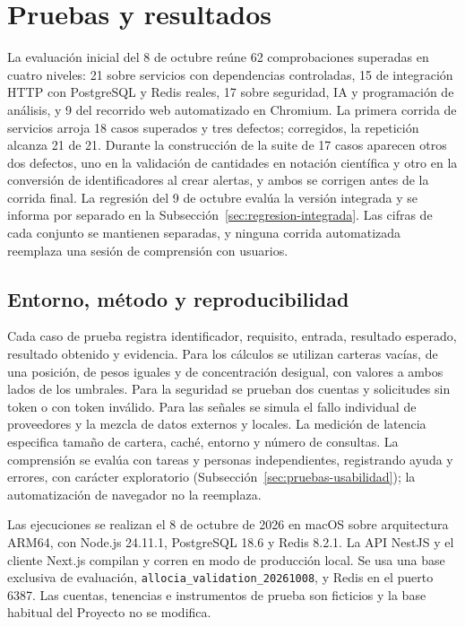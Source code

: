 \chapter{Pruebas y resultados}\label{chap:pruebas}

La evaluación inicial del 8 de octubre reúne 62 comprobaciones superadas en cuatro niveles: 21 sobre servicios con dependencias controladas, 15 de integración HTTP con PostgreSQL y Redis reales, 17 sobre seguridad, IA y programación de análisis, y 9 del recorrido web automatizado en Chromium. La primera corrida de servicios arroja 18 casos superados y tres defectos; corregidos, la repetición alcanza 21 de 21. Durante la construcción de la suite de 17 casos aparecen otros dos defectos, uno en la validación de cantidades en notación científica y otro en la conversión de identificadores al crear alertas, y ambos se corrigen antes de la corrida final. La regresión del 9 de octubre evalúa la versión integrada y se informa por separado en la Subsección~\ref{sec:regresion-integrada}. Las cifras de cada conjunto se mantienen separadas, y ninguna corrida automatizada reemplaza una sesión de comprensión con usuarios.

\section{Entorno, método y reproducibilidad}\label{sec:entorno-pruebas}\label{sec:validacion}

Cada caso de prueba registra identificador, requisito, entrada, resultado esperado, resultado obtenido y evidencia. Para los cálculos se utilizan carteras vacías, de una posición, de pesos iguales y de concentración desigual, con valores a ambos lados de los umbrales. Para la seguridad se prueban dos cuentas y solicitudes sin token o con token inválido. Para las señales se simula el fallo individual de proveedores y la mezcla de datos externos y locales. La medición de latencia especifica tamaño de cartera, caché, entorno y número de consultas. La comprensión se evalúa con tareas y personas independientes, registrando ayuda y errores, con carácter exploratorio (Subsección~\ref{sec:pruebas-usabilidad}); la automatización de navegador no la reemplaza.

Las ejecuciones se realizan el 8 de octubre de 2026 en macOS sobre arquitectura ARM64, con Node.js 24.11.1, PostgreSQL 18.6 y Redis 8.2.1. La API NestJS y el cliente Next.js compilan y corren en modo de producción local. Se usa una base exclusiva de evaluación, \texttt{allocia\_validation\_20261008}, y Redis en el puerto 6387. Las cuentas, tenencias e instrumentos de prueba son ficticios y la base habitual del Proyecto no se modifica.

